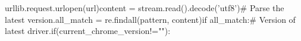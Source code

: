 \documentclass[10pt]{article} %
\begin{document}
\begin{spacing}{1.5}
urllib.request.urlopen(url)\newline        content = stream.read().decode('utf8')\newline            \# Parse the latest version.\newline        all\_match = re.findall(pattern, content)\newline                if all\_match:\newline            \# Version of latest driver.\newline            if(current\_chrome\_version!=""):\newl
\end{spacing}
\end{document}
